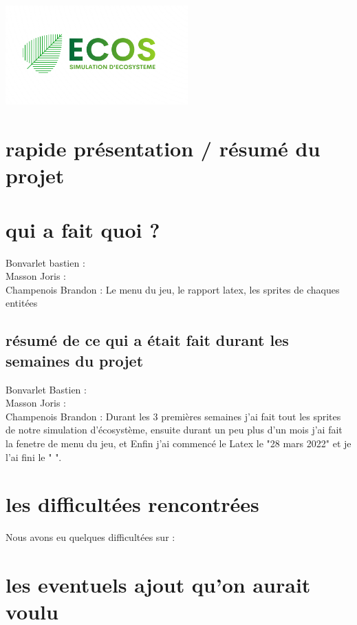 \documentclass[a4paper, 11pt]{article}
\title{}
\author{CHAMPENOIS Brandon \textsc{G5B} \\ BONVARLET Bastien \textsc{G5B} \\ MASSON Joris \textsc{G5B} }
\begin{document}
\maketitle
\centerline{\includegraphics[width = 7cm]{ecos.png}}
\tableofcontents
\newpage

\section{rapide présentation / résumé du projet}


\newpage

\section{qui a fait quoi ?}

Bonvarlet bastien :\\
Masson Joris : \\
Champenois Brandon : Le menu du jeu, le rapport latex, les sprites de chaques entitées

\subsection{résumé de ce qui a était fait durant les semaines du projet}

Bonvarlet Bastien : \\
Masson Joris : \\
Champenois Brandon : Durant les 3 premières semaines j'ai fait tout les sprites de notre simulation d'écosystème, ensuite durant un peu plus d'un mois j'ai fait la fenetre de menu du jeu, et Enfin j'ai commencé le Latex le "28 mars 2022" et je l'ai fini le " ".
\newpage

\section{les difficultées rencontrées}

Nous avons eu quelques difficultées sur :

\newpage

\section{les eventuels ajout qu'on aurait voulu}
\end{document}

